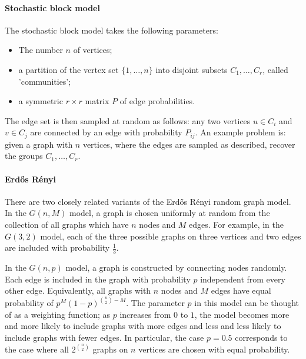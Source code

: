 \documentclass[11pt, a4paper]{article}
\begin{document}
\paragraph{Stochastic block model}
The stochastic block model takes the following parameters:
\begin{itemize}
    \item The number $n$ of vertices;
    \item a partition of the vertex set $\{1,\ldots,n\}$ into disjoint subsets $C_1,\ldots,C_r$, called 'communities';
    \item a symmetric $r \times r$ matrix $P$ of edge probabilities.
\end{itemize} 
The edge set is then sampled at random as follows: any two vertices $u \in C_i$ and $v \in C_j$ are connected by an edge with probability $P_{ij}$. An example problem is: given a graph with $n$ vertices, where the edges are sampled as described, recover the groups $C_1,\ldots,C_r$.

\paragraph{Erd\H{o}s R\'{e}nyi}
There are two closely related variants of the Erd\H{o}s R\'{e}nyi random graph model. In the $G(n,M)$ model, a graph is chosen uniformly at random from the collection of all graphs which have $n$ nodes and $M$ edges.  For example, in the $G(3,2)$ model, each of the three possible graphs on three vertices and two edges are included with probability $\frac{1}{3}$. 

In the $G(n,p)$ model, a graph is constructed by connecting nodes randomly. Each edge is included in the graph with probability $p$ independent from every other edge. Equivalently, all graphs with $n$ nodes and $M$ edges have equal probability of $p^M (1-p)^{{n \choose 2}-M}$.
The parameter $p$ in this model can be thought of as a weighting function; as $p$ increases from $0$ to $1$, the model becomes more and more likely to include graphs with more edges and less and less likely to include graphs with fewer edges. In particular, the case $p = 0.5$ corresponds to the case where all $2^\binom{n}{2}$ graphs on $n$ vertices are chosen with equal probability.
\end{document}
